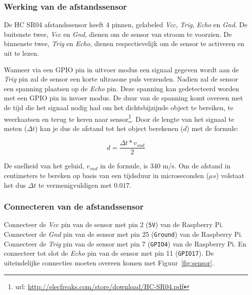 \documentclass[a4paper]{article}
\begin{document}
    \subsubsection{Werking van de afstandssensor}

      De HC SR04 afstandssensor heeft 4 pinnen, gelabeled \emph{Vcc},
\emph{Trig}, \emph{Echo} en \emph{Gnd}.  De buitenste twee, \emph{Vcc}
en \emph{Gnd}, dienen om de sensor van stroom te voorzien.  De
binnenste twee, \emph{Trig} en \emph{Echo}, dienen respectievelijk om
de sensor te activeren en uit te lezen.

      Wanneer via een GPIO pin in uitvoer modus een signaal gegeven
wordt aan de \emph{Trig} pin zal de sensor een korte ultrasone puls
verzenden.  Nadien zal de sensor een spanning plaatsen op de
\emph{Echo} pin.  Deze spanning kan gedetecteerd worden met een GPIO
pin in invoer modus.  De duur van de spanning komt overeen met de tijd
die het signaal nodig had om het dichtsbijzijnde object te bereiken,
te weerkaatsen en terug te keren naar
sensor\footnote{url: \url{http://elecfreaks.com/store/download/HC-SR04.pdf}}.
Door de lengte van het signaal te meten ($\Delta t$) kan je dus de afstand tot het
object berekenen ($d$) met de formule:

    \begin{equation}
      d = \frac{\Delta t * v_{snd}}{2}
    \end{equation}

      De snelheid van het geluid, $v_{snd}$ in de formule, is 340 m/s.
Om de afstand in centimeters te bereken op basis van een tijdsduur in
microseconden ($\mu s$) volstaat het dus $\Delta t$ te
vermenigvuldigen met $0.017$.

    \subsubsection{Connecteren van de afstandssensor}

      Connecteer de \emph{Vcc} pin van de sensor met pin 2
(\texttt{5V}) van de
Raspberry Pi.  Connecteer de \emph{Gnd} pin van de sensor met pin 25
(\texttt{Ground}) van de Raspberry Pi.  Connecteer de \emph{Trig} pin van de
sensor met pin 7 (\texttt{GPIO4}) van de Raspberry Pi.  En connecteer tot
slot de \emph{Echo} pin van de sensor met pin 11 (\texttt{GPIO17}).
De uiteindelijke connecties moeten overeen komen met
Figuur~\ref{fig:sensor}.
\end{document}
